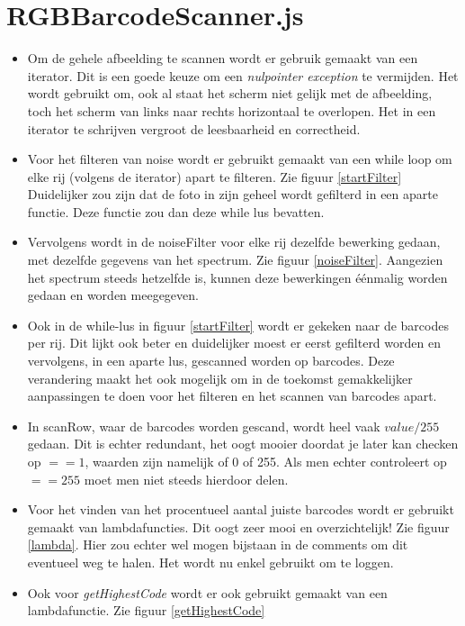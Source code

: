 \documentclass[a4paper,11pt]{article}
\begin{document}
    \section{RGBBarcodeScanner.js}
    \begin{itemize}
        \item Om de gehele afbeelding te scannen wordt er gebruik gemaakt van een iterator. Dit is een goede keuze om een {\it nulpointer exception} te vermijden. Het wordt gebruikt om, ook al staat het scherm niet gelijk met de afbeelding, toch het scherm van links naar rechts horizontaal te overlopen. Het in een iterator te schrijven vergroot de leesbaarheid en correctheid.
        \item Voor het filteren van noise wordt er gebruikt gemaakt van een while loop om elke rij (volgens de iterator) apart te filteren. Zie figuur \ref{startFilter} Duidelijker zou zijn dat de foto in zijn geheel wordt gefilterd in een aparte functie. Deze functie zou dan deze while lus bevatten.
        \item Vervolgens wordt in de noiseFilter voor elke rij dezelfde bewerking gedaan, met dezelfde gegevens van het spectrum. Zie figuur \ref{noiseFilter}. Aangezien het spectrum steeds hetzelfde is, kunnen deze bewerkingen éénmalig worden gedaan en worden meegegeven.
        \item Ook in de while-lus in figuur \ref{startFilter} wordt er gekeken naar de barcodes per rij. Dit lijkt ook beter en duidelijker moest er eerst gefilterd worden en vervolgens, in een aparte lus, gescanned worden op barcodes. Deze verandering maakt het ook mogelijk om in de toekomst gemakkelijker aanpassingen te doen voor het filteren en het scannen van barcodes apart.
        \item In scanRow, waar de barcodes worden gescand, wordt heel vaak $ value/255$ gedaan. Dit is echter redundant, het oogt mooier doordat je later kan checken op $==1$, waarden zijn namelijk of 0 of 255. Als men echter controleert op $==255$ moet men niet steeds hierdoor delen.
        \item Voor het vinden van het procentueel aantal juiste barcodes wordt er gebruikt gemaakt van lambdafuncties. Dit oogt zeer mooi en overzichtelijk! Zie figuur \ref{lambda}. Hier zou echter wel mogen bijstaan in de comments om dit eventueel weg te halen. Het wordt nu enkel gebruikt om te loggen.
        \item Ook voor {\it getHighestCode} wordt er ook gebruikt gemaakt van een lambdafunctie. Zie figuur \ref{getHighestCode}
    \end{itemize}
\end{document}
